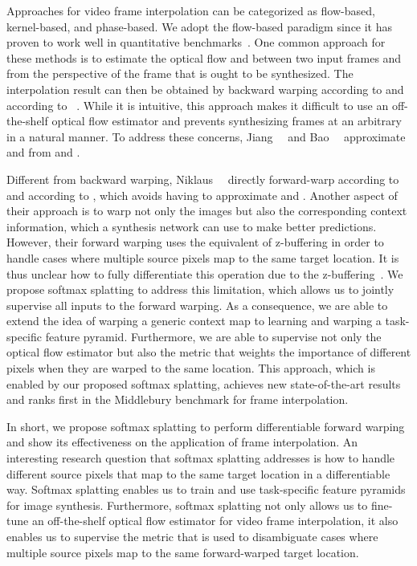\documentclass[10pt,twocolumn,letterpaper]{article}
\begin{document}
Approaches for video frame interpolation can be categorized as flow-based, kernel-based, and phase-based. We adopt the flow-based paradigm since it has proven to work well in quantitative benchmarks~\cite{Baker_IJCV_2011}. One common approach for these methods is to estimate the optical flow  and  between two input frames  and  from the perspective of the frame  that is ought to be synthesized. The interpolation result can then be obtained by backward warping  according to  and  according to ~\cite{Jaderberg_NIPS_2015}. While it is intuitive, this approach makes it difficult to use an off-the-shelf optical flow estimator and prevents synthesizing frames at an arbitrary  in a natural manner. To address these concerns, Jiang~\etal~\cite{Jiang_CVPR_2018} and Bao~\etal~\cite{Bao_CVPR_2019} approximate  and  from  and .

Different from backward warping, Niklaus~\etal~\cite{Niklaus_CVPR_2018} directly forward-warp  according to  and  according to , which avoids having to approximate  and . Another aspect of their approach is to warp not only the images but also the corresponding context information, which a synthesis network can use to make better predictions. However, their forward warping uses the equivalent of z-buffering in order to handle cases where multiple source pixels map to the same target location. It is thus unclear how to fully differentiate this operation due to the z-buffering~\cite{Nguyen_NIPS_2018}. We propose softmax splatting to address this limitation, which allows us to jointly supervise all inputs to the forward warping. As a consequence, we are able to extend the idea of warping a generic context map to learning and warping a task-specific feature pyramid. Furthermore, we are able to supervise not only the optical flow estimator but also the metric that weights the importance of different pixels when they are warped to the same location. This approach, which is enabled by our proposed softmax splatting, achieves new state-of-the-art results and ranks first in the Middlebury benchmark for frame interpolation.

In short, we propose softmax splatting to perform differentiable forward warping and show its effectiveness on the application of frame interpolation. An interesting research question that softmax splatting addresses is how to handle different source pixels that map to the same target location in a differentiable way. Softmax splatting enables us to train and use task-specific feature pyramids for image synthesis. Furthermore, softmax splatting not only allows us to fine-tune an off-the-shelf optical flow estimator for video frame interpolation, it also enables us to supervise the metric that is used to disambiguate cases where multiple source pixels map to the same forward-warped target location. 
\end{document}

